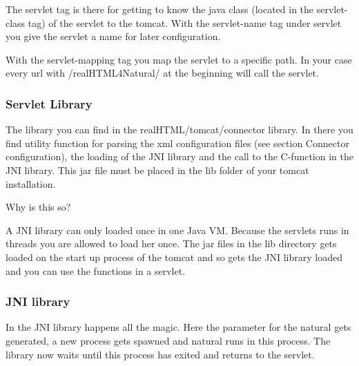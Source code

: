 \documentclass[letterpaper,10pt,english]{sphinxmanual}
\begin{document}
The servlet tag is there for getting to know the java class (located in the servlet-class tag) of the servlet to the tomcat. With the servlet-name tag under servlet you give the servlet a name for later configuration.

With the servlet-mapping tag you map the servlet to a specific path. In your case every url with \sphinxquotedblleft{}/realHTML4Natural/\sphinxquotedblright{} at the beginning will call the servlet.


\subsubsection{Servlet Library}
\label{\detokenize{connector:servlet-library}}
The library you can find in the \sphinxquotedblleft{}realHTML/tomcat/connector\sphinxquotedblright{} library. In there you find utility function for parsing the xml configuration files (see section \sphinxquotedblleft{}Connector configuration\sphinxquotedblright{}), the loading of the JNI library and the call to the C-function in the JNI library. This jar file must be placed in the \sphinxquotedblleft{}lib\sphinxquotedblright{} folder of your tomcat installation.

Why is this so?

A JNI library can only loaded once in one Java VM. Because the servlets runs in threads you are allowed to load her once. The jar files in the lib directory gets loaded on the start up process of the tomcat and so gets the JNI library loaded and you can use the functions in a servlet.


\subsubsection{JNI library}
\label{\detokenize{connector:jni-library}}
In the JNI library happens all the magic. Here the parameter for the natural gets generated, a new process gets spawned  and natural runs in this process. The library now waits until this process has exited and returns to the servlet.
\end{document}
